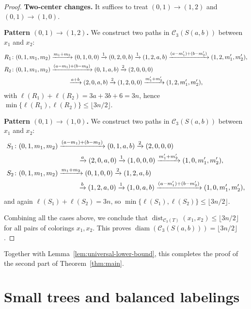 \documentclass[12pt,reqno]{amsart}
\theoremstyle{definition}
\newcommand{\C}{\mathcal{C}}
\newcommand{\diam}{\operatorname{diam}}
\newcommand{\dist}{\operatorname{dist}}
\begin{document}
\begin{proof}
\textbf{Two-center changes.}
It suffices to treat $(0,1)\to(1,2)$ and $(0,1)\to(1,0)$.


\textbf{Pattern $(0,1)\to(1,2)$.} We construct two paths in $\C_3(S(a,b))$ between $x_1$ and $x_2$:
\begin{align*}
R_1&\colon (0,1,m_1,m_2)\xrightarrow{m_1+m_2}(0,1,0,0)\xrightarrow{1}(0,2,0,b)\xrightarrow{1}(1,2,a,b)\xrightarrow{(a-m'_1)+(b-m'_2)}(1,2,m'_1,m'_2),\\
R_2&\colon (0,1,m_1,m_2)\xrightarrow{(a-m_1)+(b-m_2)}(0,1,a,b)\xrightarrow{2}(2,0,0,0)\\
&\hspace{3.3cm}\xrightarrow{a+b}(2,0,a,b)\xrightarrow{2}(1,2,0,0)\xrightarrow{m'_1+m'_2}(1,2,m'_1,m'_2),
\end{align*}
with $\ell(R_1)+\ell(R_2)=3a+3b+6=3n$, hence $\min\{\ell(R_1),\ell(R_2)\}\le\lfloor 3n/2\rfloor$.

\textbf{Pattern $(0,1)\to(1,0)$.}  We construct two paths in $\C_3(S(a,b))$ between $x_1$ and $x_2$:
\begin{align*}
S_1&\colon (0,1,m_1,m_2)\xrightarrow{(a-m_1)+(b-m_2)}(0,1,a,b)\xrightarrow{2}(2,0,0,0)\\
&\hspace{3.3cm}\xrightarrow{a}(2,0,a,0)\xrightarrow{1}(1,0,0,0)\xrightarrow{m'_1+m'_2}(1,0,m'_1,m'_2),\\
S_2&\colon (0,1,m_1,m_2)\xrightarrow{m_1+m_2}(0,1,0,0)\xrightarrow{2}(1,2,a,b)\\
&\hspace{3.3cm}\xrightarrow{b}(1,2,a,0)\xrightarrow{1}(1,0,a,b)\xrightarrow{(a-m'_1)+(b-m'_2)}(1,0,m'_1,m'_2),
\end{align*}
and again $\ell(S_1)+\ell(S_2)=3n$, so $\min\{\ell(S_1),\ell(S_2)\}\le\lfloor 3n/2\rfloor$.

Combining all the cases above, we conclude that $\dist_{\C_3(T)}(x_1,x_2)\le \lfloor 3n/2\rfloor$ for all pairs of colorings $x_1, x_2$. This proves $\diam(\C_3(S(a,b)))=\lfloor 3n/2\rfloor$.
\end{proof}

Together with Lemma~\ref{lem:universal-lower-bound}, this completes the proof of the second part of Theorem~\ref{thm:main}.

\appendix 

\section{Small trees and balanced labelings}\label{sec:small-trees}
\end{document}
